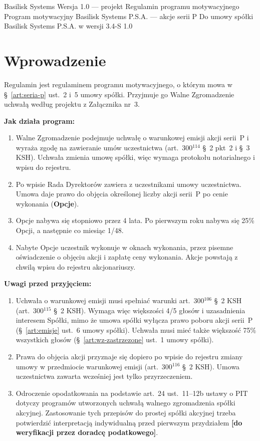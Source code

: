 \documentclass[11pt,a4paper]{report}
\newcommand{\field}[1]{\textbf{[#1]}}
\newcommand{\US}[1]{§~#1 umowy spółki}
\begin{document}
\BusinessPlanTitlePage
  {Basilisk Systems}
  {Wersja 1.0 --- projekt}
  {Regulamin programu motywacyjnego}
  {Program motywacyjny Basilisk Systems P.S.A. --- akcje serii P}
  {Do umowy spółki Basilisk Systems P.S.A. w wersji 3.4-S}
  {1.0}

\tableofcontents
\newpage

\chapter*{Wprowadzenie}

Regulamin jest regulaminem programu motywacyjnego, o którym mowa w \US{\ref{art:seria-p} ust.~2 i~5}. Przyjmuje go Walne Zgromadzenie uchwałą według projektu z Załącznika nr~3.

\textbf{Jak działa program:}
\begin{enumerate}
  \item Walne Zgromadzenie podejmuje uchwałę o warunkowej emisji akcji serii~P i wyraża zgodę na zawieranie umów uczestnictwa (art.~300$^{114}$ §~2 pkt~2 i §~3 KSH). Uchwała zmienia umowę spółki, więc wymaga protokołu notarialnego i wpisu do rejestru.
  \item Po wpisie Rada Dyrektorów zawiera z uczestnikami umowy uczestnictwa. Umowa daje prawo do objęcia określonej liczby akcji serii~P po cenie wykonania (\textbf{Opcje}).
  \item Opcje nabywa się stopniowo przez 4 lata. Po pierwszym roku nabywa się 25\% Opcji, a następnie co miesiąc 1/48.
  \item Nabyte Opcje uczestnik wykonuje w oknach wykonania, przez pisemne oświadczenie o objęciu akcji i zapłatę ceny wykonania. Akcje powstają z chwilą wpisu do rejestru akcjonariuszy.
\end{enumerate}

\textbf{Uwagi przed przyjęciem:}
\begin{enumerate}
  \item Uchwała o warunkowej emisji musi spełniać warunki art.~300$^{106}$ §~2 KSH (art.~300$^{115}$ §~2 KSH). Wymaga więc większości 4/5 głosów i uzasadnienia interesem Spółki, mimo że umowa spółki wyłącza prawo poboru akcji serii~P (\US{\ref{art:emisje} ust.~6}). Uchwała musi mieć także większość 75\% wszystkich głosów (\US{\ref{art:wz-zastrzezone} ust.~1}).
  \item Prawa do objęcia akcji przyznaje się dopiero po wpisie do rejestru zmiany umowy w przedmiocie warunkowej emisji (art.~300$^{116}$ §~2 KSH). Umowa uczestnictwa zawarta wcześniej jest tylko przyrzeczeniem.
  \item Odroczenie opodatkowania na podstawie art.~24 ust.~11--12b ustawy o PIT dotyczy programów utworzonych uchwałą walnego zgromadzenia spółki akcyjnej. Zastosowanie tych przepisów do prostej spółki akcyjnej trzeba potwierdzić interpretacją indywidualną przed pierwszym przydziałem \field{do weryfikacji przez doradcę podatkowego}.
\end{enumerate}
\end{document}
